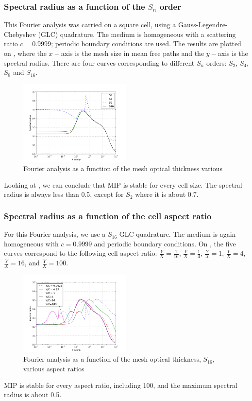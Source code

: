 \subsubsection{Spectral radius as a function of the $S_n$ order}
This Fourier analysis was carried on a square cell, using a
Gauss-Legendre-Chebyshev (GLC) quadrature. The medium is homogeneous with a 
scattering ratio $c=0.9999$; periodic boundary conditions are used. The results 
are plotted on , where the $x-$axis is the mesh size in mean free 
paths and the $y-$axis is the spectral radius. There are four curves corresponding 
to different $S_n$ orders: $S_2$, $S_4$, $S_8$ and $S_{16}$.
\begin{figure}[H]
  \centering
  \includegraphics[width=0.5\textwidth]{sn_order_9999}
  \caption{Fourier analysis as a function of the mesh optical thickness
    various}
  \label{fig_fa_sn}
\end{figure}
Looking at , we can conclude that MIP is stable for every 
cell size. The spectral radius is always less than 0.5, except for $S_2$ where 
it is about 0.7.
\subsubsection{Spectral radius as a function of the cell aspect ratio}
For this Fourier analysis, we use a $S_{16}$ GLC quadrature. The medium is
again homogeneous with $c=0.9999$ and periodic boundary conditions. 
On , the five curves correspond to the following cell aspect 
ratio: $\frac{Y}{X}=\frac{1}{16}$, $\frac{Y}{X}=\frac{1}{4}$,
$\frac{Y}{X}=1$, $\frac{Y}{X}=4$, $\frac{Y}{X}=16$, and $\frac{Y}{X}=100$.
\begin{figure}[H]
  \centering
  \includegraphics[width=0.5\textwidth]{aspect_ratio_9999_2}
  \caption{Fourier analysis as a function of the mesh optical thickness,
  $S_{16}$, various aspect ratios}
  \label{fig_fa_ar}
\end{figure}
MIP is stable for every aspect ratio, including 100, and the maximum spectral radius
is about 0.5.

